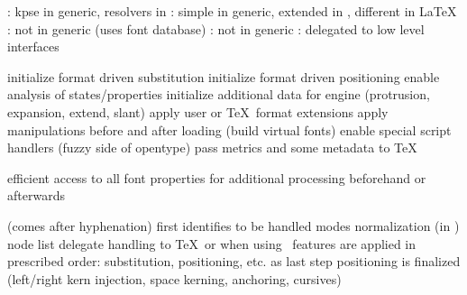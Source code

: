 \stopsubject

\startsubject[title={locating (opentype) fonts}]

    \startitemize
        \startitem
            : kpse in generic, resolvers in \ConTeXt
        \stopitem
        \startitem
            : simple in generic, extended in \ConTeXt,
            different in \LaTeX
        \stopitem
        \startitem
            : not in generic (uses font database)
        \stopitem
        \startitem
            : not in generic
        \stopitem
        \startitem
            : delegated to low level interfaces
        \stopitem
    \stopitemize

\stopsubject

\stoptitle

\starttitle[title={preparations}]

\startsubject[title={after loading}]

    \startitemize
        \startitem
            initialize format driven substitution
        \stopitem
        \startitem
            initialize format driven positioning
        \stopitem
        \startitem
            enable analysis of states/properties
        \stopitem
        \startitem
            initialize additional data for engine (protrusion, expansion, extend,
            slant)
        \stopitem
        \startitem
            apply user or \TeX\ format extensions
        \stopitem
        \startitem
            apply manipulations before and after loading
        \stopitem
        \startitem
            (build virtual fonts)
        \stopitem
        \startitem
            enable special script handlers (fuzzy side of opentype)
        \stopitem
        \startitem
            pass metrics and some metadata to \TeX
        \stopitem
    \stopitemize

\stopsubject

\startsubject[title={benefit}]

    efficient access to all font properties for additional processing beforehand
    or afterwards

\stopsubject

\stoptitle

\starttitle[title={processing}]

\startsubject[title={steps}]

    \startitemize
        \startitem
            (comes after hyphenation)
        \stopitem
        \startitem
            first identifies to be handled modes
        \stopitem
        \startitem
            normalization (in \ConTeXt) node list
        \stopitem
        \startitem
            delegate handling to \TeX\ or \Lua
        \stopitem
        \startitem
            when using \Lua\ features are applied in prescribed order:
            substitution, positioning, etc.
        \stopitem
        \startitem
            as last step positioning is finalized (left/right kern injection,
            space kerning, anchoring, cursives)
        \stopitem
    \stopitemize

